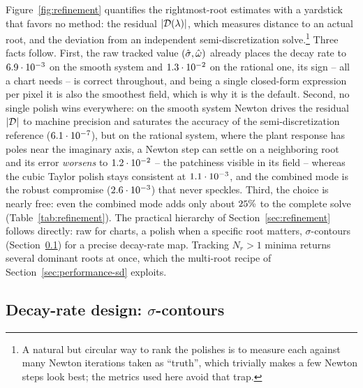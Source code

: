 \begin{table}[tb]
  \centering
  \caption{Median error of the dominant root's decay rate $\Real\lam$ against
  a semi-discretization reference, for each refinement, on the smooth
  (showcase) and non-smooth (turning) systems of Fig.~\ref{fig:refinement}.
  Times are per parameter point for the complete solve; overhead is measured
  against the raw (unrefined) solve.}\label{tab:refinement}
\end{table}

Figure~\ref{fig:refinement} quantifies the rightmost-root estimates with a
yardstick that favors no method: the residual $|\mathcal{D}(\lambda)|$, which
measures distance to an actual root, and the deviation from an independent
semi-discretization solve.\footnote{A natural but circular way to rank the
polishes is to measure each against many Newton iterations taken as
``truth'', which trivially makes a few Newton steps look best; the metrics
used here avoid that trap.} Three facts follow. First, the raw tracked value
$(\hat{\sigma},\hat{\omega})$ already places the decay rate to $6.9 \cdot 10^{-3}$ on the smooth
system and $1.3 \cdot 10^{-2}$ on the rational one, its sign -- all a chart needs
-- is correct throughout, and being a single closed-form expression per
pixel it is also the smoothest field, which is why it is the default.
Second, no single polish wins everywhere: on the smooth system Newton
drives the residual $|\mathcal{D}|$ to machine precision and saturates the
accuracy of the semi-discretization reference ($6.1 \cdot 10^{-7}$), but on
the rational system,
where the plant response has poles near the imaginary axis, a Newton step
can settle on a neighboring root and its error \emph{worsens} to
$1.2 \cdot 10^{-2}$ -- the patchiness visible in its field -- whereas the cubic
Taylor polish stays consistent at $1.1 \cdot 10^{-3}$, and the combined mode
is the robust compromise ($2.6 \cdot 10^{-3}$) that never speckles. Third, the
choice is nearly free: even the combined mode adds only about
$25\%$ to the complete solve (Table~\ref{tab:refinement}). The
practical hierarchy of Section~\ref{sec:refinement} follows directly: raw
for charts, a polish when a specific root matters, $\sigma$-contours
(Section~\ref{sec:showcase-sigma}) for a precise decay-rate map. Tracking
$N_r>1$ minima returns several dominant roots at once, which the multi-root
recipe of Section~\ref{sec:performance-sd} exploits.

\subsection{Decay-rate design: $\sigma$-contours}\label{sec:showcase-sigma}

